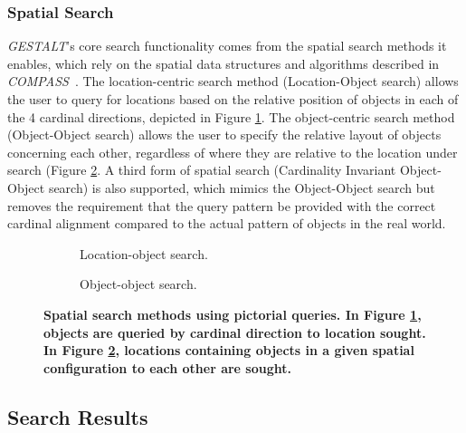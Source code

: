 \subsubsection{\textbf{Spatial Search}}
\emph{GESTALT}'s core search functionality comes from the spatial search methods it enables, which rely on the spatial data structures and algorithms described in \emph{COMPASS}~\cite{Osul2023}.
The location-centric search method (Location-Object search) allows the user to query for locations based on the relative position of objects in each of the 4 cardinal directions, depicted in Figure \ref{fig:spatial_search_loc}.
The object-centric search method (Object-Object search) allows the user to specify the relative layout of objects concerning each other, regardless of where they are relative to the location under search (Figure \ref{fig:spatial_search_obj}.
A third form of spatial search (Cardinality Invariant Object-Object search) is also supported, which mimics the Object-Object search but removes the requirement that the query pattern be provided with the correct cardinal alignment compared to the actual pattern of objects in the real world.


\begin{figure}[h]
    \centering
    \begin{subfigure}[t]{.2\textwidth}
        
        \caption{\small Location-object search.} 
        \label{fig:spatial_search_loc}
    \end{subfigure}
    \hfill
    \begin{subfigure}[t]{.2\textwidth}
        
        \caption{\small Object-object search.} 
        \label{fig:spatial_search_obj}
    \end{subfigure}
    \hfill
    \caption{\textbf{Spatial search methods using pictorial queries. In Figure \ref{fig:spatial_search_loc}, objects are queried by cardinal direction to location sought. In Figure \ref{fig:spatial_search_obj}, locations containing objects in a given spatial configuration to each other are sought.}}\label{figure:spatial_search} 
\end{figure}



\subsection{Search Results}

